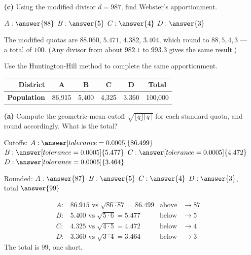 \documentclass[12pt]{ximera}
\begin{document}
\begin{problem}
\begin{prompt}
\textbf{(c)} Using the modified divisor $d=987$, find Webster's apportionment.

$A:\answer{88}$ \quad $B:\answer{5}$ \quad $C:\answer{4}$ \quad $D:\answer{3}$

\begin{feedback}
The modified quotas are $88.060$, $5.471$, $4.382$, $3.404$, which round to
$88, 5, 4, 3$ --- a total of $100$. \checkmark (Any divisor from about $982.1$ to $993.3$
gives the same result.)
\end{feedback}
\end{prompt}
\end{problem}

\begin{problem}
Use the Huntington-Hill method to complete the same apportionment.
\begin{center}
\begin{tabular}{|r|c|c|c|c|c|}\hline
\textbf{District} & A & B & C & D & \textbf{Total}\\\hline
\textbf{Population} & 86{,}915 & 5{,}400 & 4{,}325 & 3{,}360 & 100{,}000\\\hline
\end{tabular}
\end{center}

\begin{prompt}
\textbf{(a)} Compute the geometric-mean cutoff $\sqrt{\lfloor q\rfloor\lceil q\rceil}$ for
each standard quota, and round accordingly. What is the total?

Cutoffs: $A:\answer[tolerance=0.0005]{86.499}$ \quad $B:\answer[tolerance=0.0005]{5.477}$
\quad $C:\answer[tolerance=0.0005]{4.472}$ \quad $D:\answer[tolerance=0.0005]{3.464}$

\smallskip
Rounded: $A:\answer{87}$ \quad $B:\answer{5}$ \quad $C:\answer{4}$ \quad $D:\answer{3}$,
\quad total $\answer{99}$

\begin{feedback}
\[
\begin{array}{llll}
A: & 86.915 \text{ vs } \sqrt{86\cdot 87}=86.499 & \text{above} & \to 87\\
B: & 5.400 \text{ vs } \sqrt{5\cdot 6}=5.477 & \text{below} & \to 5\\
C: & 4.325 \text{ vs } \sqrt{4\cdot 5}=4.472 & \text{below} & \to 4\\
D: & 3.360 \text{ vs } \sqrt{3\cdot 4}=3.464 & \text{below} & \to 3
\end{array}
\]
The total is $99$, one short.
\end{feedback}
\end{prompt}


\end{problem}
\end{document}

